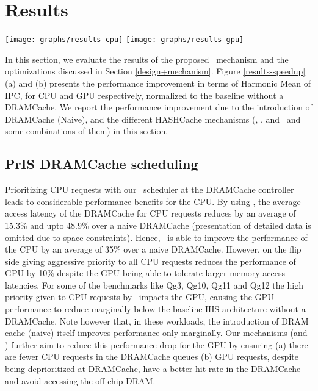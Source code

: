 \section{Results} \label{results}
\begin{figure*}[!htb]
    \centering
    \texttt{[image: graphs/results-cpu]}
    \texttt{[image: graphs/results-gpu]}
    \caption{Speedups obtained by adding a stacked DRAMCache for (a) CPU (b) GPU}
    \label{results-speedup}
\end{figure*}

In this section, we evaluate the results of the proposed \cachename\ mechanism and the optimizations discussed in Section \ref{design+mechanism}. Figure \ref{results-speedup} (a) and (b) presents the performance improvement in terms of Harmonic Mean of IPC, for CPU and GPU respectively, normalized to the baseline without a DRAMCache. We report the performance improvement due to the introduction of DRAMCache (Naive),  and the different HASHCache mechanisms (\prioname, \bypassname, and \chaining\ and some combinations of them) in this section. 

\subsection{PrIS DRAMCache scheduling}
Prioritizing CPU requests with our \prioname\ scheduler at the DRAMCache controller leads to considerable performance benefits for the CPU. By using \prioname, the average access latency of the DRAMCache for CPU requests reduces by an average of 15.3\% and upto 48.9\% over a naive DRAMCache (presentation of detailed data is omitted due to space constraints). Hence, \prioname\ is able to improve the performance of the CPU by an average of 35\% over a naive DRAMCache. However, on the flip side giving aggressive priority to all CPU requests reduces the performance of GPU by 10\% despite the GPU being able to tolerate larger memory access latencies. For some of the benchmarks like Qg3, Qg10, Qg11 and Qg12 the high priority given to CPU requests by \prioname\ impacts the GPU, causing the GPU performance to reduce marginally below the baseline IHS architecture without a DRAMCache. Note however that, in these workloads, the introduction of DRAM cache (naive) itself improves performance only marginally. Our mechanisms (\bypassname and \chaining) further aim to reduce this performance drop for the GPU by ensuring (a) there are fewer CPU requests in the DRAMCache queues (b) GPU requests, despite being deprioritized at DRAMCache, have a better hit rate in the DRAMCache and avoid accessing the off-chip DRAM.
